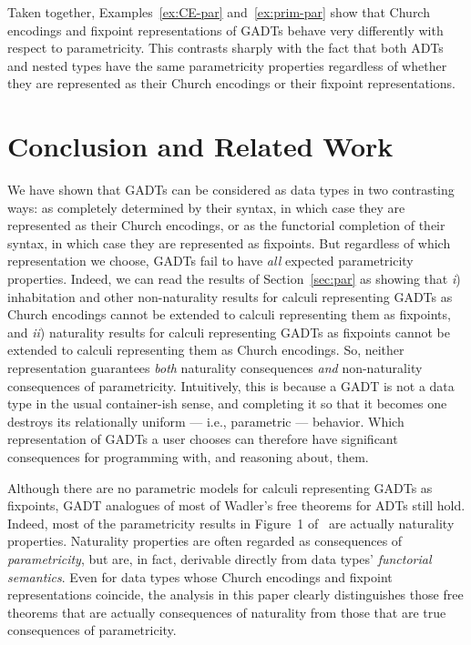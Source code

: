 \documentclass[submission,copyright,creativecommons]{eptcs}
\begin{document}
Taken together, Examples~\ref{ex:CE-par} and~\ref{ex:prim-par} show
that Church encodings and fixpoint representations of GADTs behave
very differently with respect to parametricity.  This contrasts
sharply with the fact that both ADTs and nested types have the same
parametricity properties regardless of whether they are represented as
their Church encodings or their fixpoint representations.

\section{Conclusion and Related Work}

We have shown that GADTs can be considered as data types in two
contrasting ways: as completely determined by their syntax, in which
case they are represented as their Church encodings, or as the
functorial completion of their syntax, in which case they are
represented as fixpoints.  But regardless of which representation we
choose, GADTs fail to have {\em all} expected parametricity
properties. Indeed, we can read the results of Section~\ref{sec:par}
as showing that {\em i}) inhabitation and other non-naturality results
for calculi representing GADTs as Church encodings cannot be extended
to calculi representing them as fixpoints, and {\em ii}) naturality
results for calculi representing GADTs as fixpoints cannot be extended
to calculi representing them as Church encodings. So, neither
representation guarantees {\em both} naturality consequences {\em and}
non-naturality consequences of parametricity. Intuitively, this is
because a GADT is not a data type in the usual container-ish sense,
and completing it so that it becomes one destroys its relationally
uniform --- i.e., parametric --- behavior.  Which representation of
GADTs a user chooses can therefore have significant consequences for
programming with, and reasoning about, them.

Although there are no parametric models for calculi representing GADTs
as fixpoints, GADT analogues of most of Wadler's free theorems for
ADTs still hold.
Indeed, most of the parametricity results in Figure~1 of~\cite{wad89}
are actually naturality properties.
Naturality properties are often regarded as consequences of {\em
  parametricity}, but are, in fact, derivable directly from data
types' {\em functorial semantics}. Even for data types whose Church
encodings and fixpoint representations coincide, the analysis in this
paper clearly distinguishes those free theorems that are actually
consequences of naturality from those that are true consequences of
parametricity.
\end{document}
